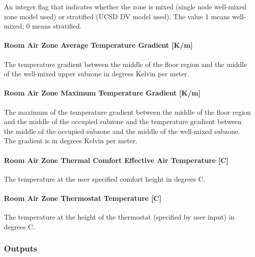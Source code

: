 An integer flag that indicates whether the zone is mixed (single node well-mixed zone model used) or stratified (UCSD DV model used). The value 1 means well-mixed; 0 means stratified.

\paragraph{Room Air Zone Average Temperature Gradient {[}K/m{]}}\label{room-air-zone-average-temperature-gradient-km}

The temperature gradient between the middle of the floor region and the middle of the well-mixed upper subzone in degrees Kelvin per meter.

\paragraph{Room Air Zone Maximum Temperature Gradient {[}K/m{]}}\label{room-air-zone-maximum-temperature-gradient-km}

The maximum of the temperature gradient between the middle of the floor region and the middle of the occupied subzone and the temperature gradient between the middle of the occupied subzone and the middle of the well-mixed subzone. The gradient is in degrees Kelvin per meter.

\paragraph{Room Air Zone Thermal Comfort Effective Air Temperature {[}C{]}}\label{room-air-zone-thermal-comfort-effective-air-temperature-c}

The temperature at the user specified comfort height in degrees C.

\paragraph{Room Air Zone Thermostat Temperature {[}C{]}}\label{room-air-zone-thermostat-temperature-c}

The temperature at the height of the thermostat (specified by user input) in degrees C.

\subsubsection{Outputs}\label{outputs-5-009}

